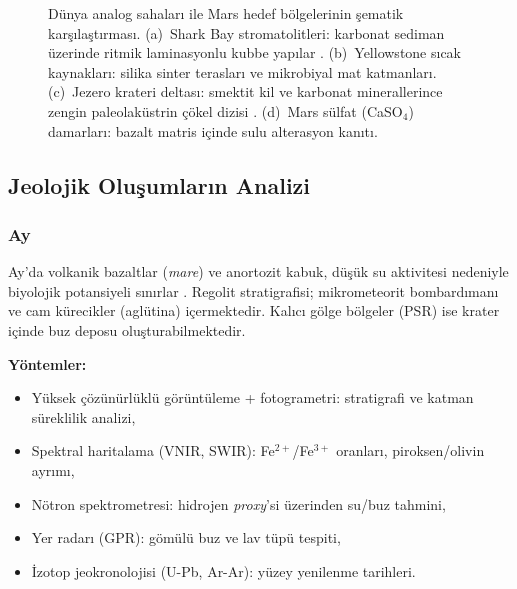 \documentclass[12pt,a4paper]{article}
\begin{document}
\begin{figure}[ht]
\caption{Dünya analog sahaları ile Mars hedef bölgelerinin şematik karşılaştırması. (a)~Shark Bay stromatolitleri: karbonat sediman üzerinde ritmik laminasyonlu kubbe yapılar \cite{allwood2006}. (b)~Yellowstone sıcak kaynakları: silika sinter terasları ve mikrobiyal mat katmanları. (c)~Jezero krateri deltası: smektit kil ve karbonat minerallerince zengin paleolaküstrin çökel dizisi \cite{farley2020}. (d)~Mars sülfat (CaSO$_4$) damarları: bazalt matris içinde sulu alterasyon kanıtı.}
\label{fig:analog}
\end{figure}

\subsection{Jeolojik Oluşumların Analizi}

\subsubsection*{Ay}
Ay'da volkanik bazaltlar (\textit{mare}) ve anortozit kabuk, düşük su aktivitesi nedeniyle biyolojik potansiyeli sınırlar \cite{smith2010, robinson2010}. Regolit stratigrafisi; mikrometeorit bombardımanı ve cam kürecikler (aglütina) içermektedir. Kalıcı gölge bölgeler (PSR) ise krater içinde buz deposu oluşturabilmektedir.

\textbf{Yöntemler:}
\begin{itemize}
    \item Yüksek çözünürlüklü görüntüleme + fotogrametri: stratigrafi ve katman süreklilik analizi,
    \item Spektral haritalama (VNIR, SWIR): Fe$^{2+}$/Fe$^{3+}$ oranları, piroksen/olivin ayrımı,
    \item Nötron spektrometresi: hidrojen \textit{proxy}'si üzerinden su/buz tahmini,
    \item Yer radarı (GPR): gömülü buz ve lav tüpü tespiti,
    \item İzotop jeokronolojisi (U-Pb, Ar-Ar): yüzey yenilenme tarihleri.
\end{itemize}
\end{document}
